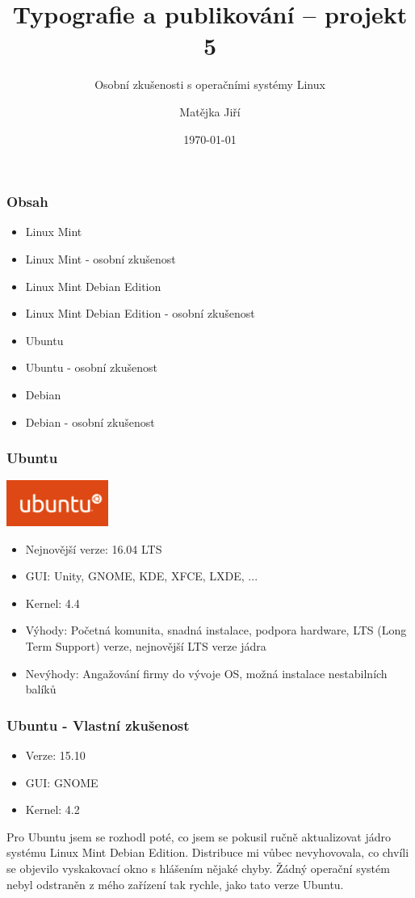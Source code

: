 \documentclass{beamer}
\title{Typografie a publikování -- projekt 5}
\subtitle{Osobní zkušenosti s operačními systémy Linux}
\author{Matějka Jiří}
\date{\today}
\begin{document}
  \frame{\titlepage}
  \begin{frame}
    \frametitle{Obsah}
    
    \begin{itemize}
      \item Linux Mint
      \item Linux Mint - osobní zkušenost
      \item Linux Mint Debian Edition
      \item Linux Mint Debian Edition - osobní zkušenost
      \item Ubuntu
      \item Ubuntu - osobní zkušenost
      \item Debian
      \item Debian - osobní zkušenost
    \end{itemize}
  \end{frame}
  \begin{frame}
    \frametitle{Ubuntu}
    \hspace{2mm}
    \includegraphics[height=1.5cm]{ubuntu.png}
	\begin{itemize}
		\item Nejnovější verze: 16.04 LTS
		\item GUI: Unity, GNOME, KDE, XFCE, LXDE, ...
		\item Kernel: 4.4
		\item Výhody: Početná komunita, snadná instalace, podpora hardware, LTS (Long Term Support) verze, nejnovější LTS verze jádra
		\item Nevýhody: Angažování firmy do vývoje OS, možná instalace nestabilních balíků
	\end{itemize}
  \end{frame}
  \begin{frame}
    \frametitle{Ubuntu - Vlastní zkušenost}
      \begin{itemize}
	\item Verze: 15.10
	\item GUI: GNOME
	\item Kernel: 4.2
      \end{itemize}
      Pro Ubuntu jsem se rozhodl poté, co jsem se pokusil ručně aktualizovat
      jádro systému Linux Mint Debian Edition. Distribuce mi vůbec nevyhovovala,
      co chvíli se objevilo vyskakovací okno s hlášením nějaké chyby. Žádný operační systém
      nebyl odstraněn z mého zařízení tak rychle, jako tato verze Ubuntu.
  \end{frame}
\end{document}
